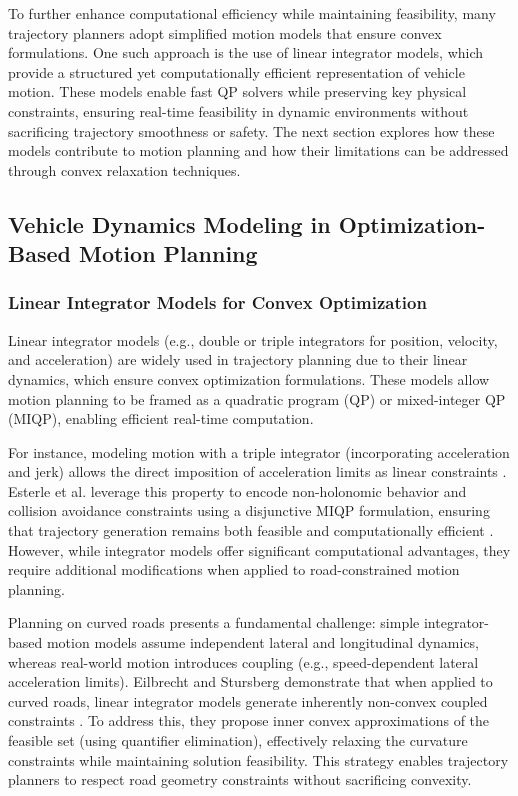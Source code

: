 To further enhance computational efficiency while maintaining feasibility, many trajectory planners adopt simplified motion models that ensure convex
formulations.
One such approach is the use of linear integrator models, which provide a structured yet computationally efficient representation of vehicle motion.
These models enable fast QP solvers while preserving key physical constraints, ensuring real-time feasibility in dynamic environments without
sacrificing trajectory smoothness or safety.
The next section explores how these models contribute to motion planning and how their limitations can be addressed through convex relaxation
techniques.

\subsection{Vehicle Dynamics Modeling in Optimization-Based Motion Planning}

\subsubsection{Linear Integrator Models for Convex Optimization}

Linear integrator models (e.g., double or triple integrators for position, velocity, and acceleration) are widely used in trajectory planning due to
their linear dynamics, which ensure convex optimization formulations.
These models allow motion planning to be framed as a quadratic program (QP) or mixed-integer QP (MIQP), enabling efficient real-time computation.

For instance, modeling motion with a triple integrator (incorporating acceleration and jerk) allows the direct imposition of acceleration limits as
linear constraints \cite{esterle_optimal_2020}.
Esterle et al.
leverage this property to encode non-holonomic behavior and collision avoidance constraints using a disjunctive MIQP formulation, ensuring that trajectory generation remains both feasible and computationally efficient \cite{esterle_optimal_2020}.
However, while integrator models offer significant computational advantages, they require additional modifications when applied to road-constrained
motion planning.

Planning on curved roads presents a fundamental challenge: simple integrator-based motion models assume independent lateral and longitudinal
dynamics, whereas real-world motion introduces coupling (e.g., speed-dependent lateral acceleration limits).
Eilbrecht and Stursberg demonstrate that when applied to curved roads, linear integrator models generate inherently non-convex coupled constraints
\cite{eilbrecht_challenges_2020}.
To address this, they propose inner convex approximations of the feasible set (using quantifier elimination), effectively relaxing the curvature
constraints while maintaining solution feasibility.
This strategy enables trajectory planners to respect road geometry constraints without sacrificing convexity.


